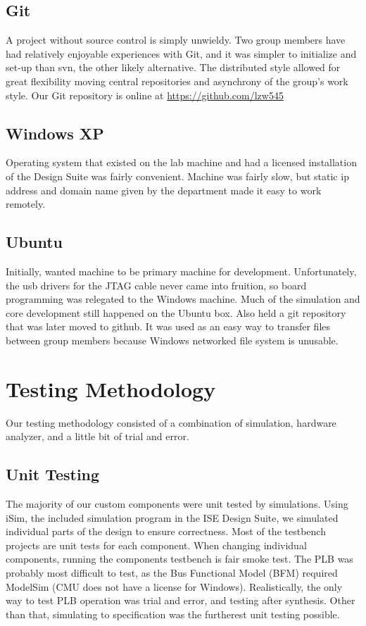 \documentclass[letterpaper,10pt]{article}
\begin{document}
\subsection{Git}
A project without source control is simply unwieldy.  Two group members have had relatively enjoyable experiences with Git, and it was simpler to initialize and set-up than svn, the other likely alternative.  The distributed style allowed for great flexibility moving central repositories and asynchrony of the group's work style. Our Git repository is online at \url{https://github.com/lzw545}

\subsection{Windows XP}
Operating system that existed on the lab machine and had a licensed installation of the Design Suite was fairly convenient.  Machine was fairly slow, but static ip address and domain name given by the department made it easy to work remotely.

\subsection{Ubuntu}
Initially, wanted machine to be primary machine for development.  Unfortunately, the usb drivers for the JTAG cable never came into fruition, so board programming was relegated to the Windows machine.  Much of the simulation and core development still happened on the Ubuntu box.  Also held a git repository that was later moved to github.  It was used as an easy way to transfer files between group members because Windows networked file system is unusable.  

\section{Testing Methodology}
Our testing methodology consisted of a combination of simulation, hardware analyzer, and a little bit of trial and error.

\subsection{Unit Testing}
The majority of our custom components were unit tested by simulations. Using iSim, the included simulation program in the ISE Design Suite, we simulated individual parts of the design to ensure correctness.  Most of the testbench projects are unit tests for each component.  When changing individual components, running the components testbench is fair smoke test.  The PLB was probably most difficult to test, as the Bus Functional Model (BFM) required ModelSim (CMU does not have a license for Windows).  Realistically, the only way to test PLB operation was trial and error, and testing after synthesis.  Other than that, simulating to specification was the furtherest unit testing possible. 
\end{document}

